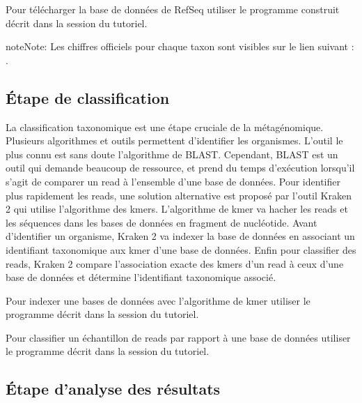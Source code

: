 \documentclass[letterpaper,10pt,french]{sphinxmanual}
\begin{document}
Pour télécharger la base de données de RefSeq utiliser le programme construit décrit dans la session {\hyperref[\detokenize{tutorial:download-refseq}]{}} du tutoriel.

\begin{sphinxadmonition}{note}{Note:}
Les chiffres officiels pour chaque taxon sont visibles sur le lien suivant :  .
\end{sphinxadmonition}


\subsection{Étape de classification}
\label{\detokenize{overview:etape-de-classification}}
La classification taxonomique est une étape cruciale de la métagénomique. Plusieurs algorithmes et outils permettent d’identifier les organismes. L’outil le plus connu est sans doute l’algorithme de BLAST. Cependant, BLAST est un outil qui demande beaucoup de ressource, et prend du temps d’exécution lorsqu’il s’agit de comparer un read à l’ensemble d’une base de données. Pour identifier plus rapidement les reads, une solution alternative est proposé par l’outil Kraken 2 qui utilise l’algorithme des k\sphinxhyphen{}mers. L’algorithme de k\sphinxhyphen{}mer va hacher les reads et les séquences dans les bases de données en fragment de nucléotide. Avant d’identifier un organisme, Kraken 2 va indexer la base de données en associant un identifiant taxonomique aux k\sphinxhyphen{}mer d’une base de données. Enfin pour classifier des reads, Kraken 2 compare l’association exacte des k\sphinxhyphen{}mers d’un read à ceux d’une base de données et détermine l’identifiant taxonomique associé.

Pour indexer une bases de données avec l’algorithme de k\sphinxhyphen{}mer utiliser le programme décrit dans la session {\hyperref[\detokenize{tutorial:indexation-kraken2}]{}} du tutoriel.

Pour classifier un échantillon de reads par rapport à une base de données utiliser le programme décrit dans la session {\hyperref[\detokenize{tutorial:classification-kraken2}]{}} du tutoriel.


\subsection{Étape d’analyse des résultats}
\label{\detokenize{overview:etape-d-analyse-des-resultats}}
\end{document}
